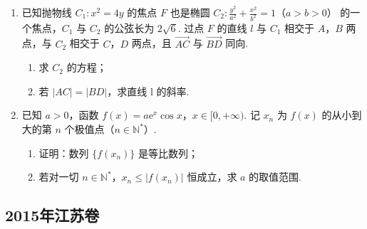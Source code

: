 \begin{description}
\begin{enumerate}[leftmargin=5pt]
\begin{enumerate}
\item 证明： \(a_{n+2} = 3a_n\)；
\item 求 \(S_{n}\).
\end{enumerate}

        \item 已知抛物线 \(C_1: x^2 = 4y\) 的焦点 \(F\) 也是椭圆 \(C_2: \frac{y^2}{a^2} + \frac{x^2}{b^2} = 1\)（\(a > b > 0\)） 的一个焦点，\(C_1\) 与 \(C_2\) 的公弦长为 \(2\sqrt{6}\). 过点 \(F\) 的直线 \(l\) 与 \(C_1\) 相交于 \(A\)，\(B\) 两点，与 \(C_2\) 相交于 \(C\)，\(D\) 两点，且 \(\overrightarrow{AC}\) 与 \(\overrightarrow{BD}\) 同向.
\begin{enumerate}
\item 求 \(C_{2}\) 的方程；
\item 若 \( \left|AC\right|=\left|BD\right| \)，求直线 l 的斜率.
\end{enumerate}

        \item 已知 \(a > 0\)，函数 \(f(x) = a{\mathrm{e}}^{x}\cos x\)，\(x \in [0, +\infty)\). 记 \(x_n\) 为 \(f(x)\) 的从小到大的第 \(n\) 个极值点（\(n \in \mathbb{N}^*\)）.
\begin{enumerate}
\item 证明：数列 \( \{f(x_{n})\} \) 是等比数列；
\item 若对一切 \(n \in \mathbb{N}^*\)，\(x_n \leqslant |f(x_n)|\) 恒成立，求 \(a\) 的取值范围.
\end{enumerate}

    \end{enumerate}

\end{description}


\subsection{2015年江苏卷}\label{gk:2015年江苏卷}

